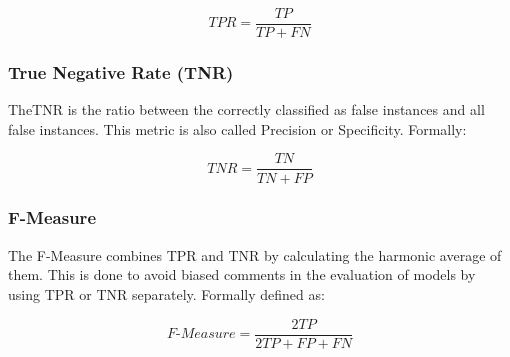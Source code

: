 \[ TPR = \frac{TP}{TP+FN} \]

\subsubsection{True Negative Rate (TNR)}

TheTNR is the ratio between the correctly classified as false instances and all false instances. This metric is also called Precision or Specificity. Formally:

\[ TNR = \frac{TN}{TN+FP} \]

\subsubsection{F-Measure}

The F-Measure combines TPR and TNR by calculating the harmonic average of them. This is done to avoid biased comments in the evaluation of models by using TPR or TNR separately. Formally defined as: 

\[ F\mbox{-}Measure = \frac{2TP}{2TP+FP+FN} \]

